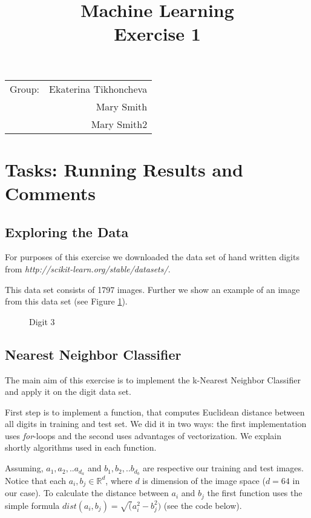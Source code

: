 \documentclass{article}
\title{Machine Learning \\ \bf{Exercise 1} } %
\begin{document}
\maketitle

\begin{center}
\begin{tabular}{l r}
Group: & Ekaterina Tikhoncheva \\ 
		& Mary Smith \\
		& Mary Smith2 \\
\end{tabular}
\end{center}

\section{Tasks: Running Results and Comments}

\subsection{Exploring the Data}

For purposes of this exercise we downloaded the data set of hand written digits from {\it http://scikit-learn.org/stable/datasets/}.

This data set consists of 1797 images. Further we show an example of an image from this data set (see Figure \ref{fig1}).


\begin{figure}[ht]
	\centering
	\caption{Digit 3}
	\label{fig1}
\end{figure}

\subsection{Nearest Neighbor Classifier}

The main aim of this exercise is to implement the k-Nearest Neighbor Classifier and apply it on the digit data set.

First step is to implement a function, that computes Euclidean distance between all digits in training and test set. We did it in two ways: the first implementation uses {\it for}-loops and the second uses advantages of vectorization. We explain shortly algorithms used in each function.

Assuming, $a_1,a_2,..a_{d_a}$ and $b_1,b_2,..b_{d_b}$ are respective our training and test images. Notice that each $a_i, b_j \in \mathbb{R}^{d}$, where $d$ is dimension  of the image space ($d=64$ in our case). To calculate the distance between $a_i$ and $b_j$ the first function uses the simple formula $dist(a_i,b_j) = \sqrt(a_i^2 - b_j^2)$ (see the code below).
\end{document}
